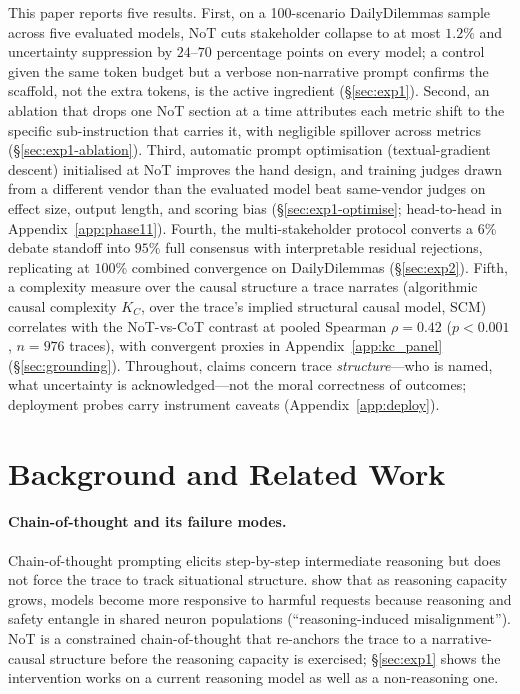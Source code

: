 \documentclass[11pt]{article}
\begin{document}
This paper reports five results. First, on a 100-scenario
DailyDilemmas sample across five evaluated models, NoT cuts
stakeholder collapse to at most $1.2\%$ and uncertainty suppression by
$24$--$70$ percentage points on every model; a control given the same
token budget but a verbose non-narrative prompt confirms the scaffold,
not the extra tokens, is the active ingredient (\S\ref{sec:exp1}).
Second, an ablation that drops one NoT section at a time attributes
each metric shift to the specific sub-instruction that carries it,
with negligible spillover across metrics
(\S\ref{sec:exp1-ablation}). Third, automatic prompt optimisation
(textual-gradient descent) initialised at NoT improves the hand
design, and training judges drawn from a different vendor than the
evaluated model beat same-vendor judges on effect size, output length,
and scoring bias (\S\ref{sec:exp1-optimise};
head-to-head in Appendix~\ref{app:phase11}). Fourth, the
multi-stakeholder protocol converts a $6\%$ debate standoff into
$95\%$ full consensus with interpretable residual rejections, replicating
at $100\%$ combined convergence on DailyDilemmas (\S\ref{sec:exp2}).
Fifth, a complexity measure over the causal structure a trace narrates
(algorithmic causal complexity $K_C$, over the trace's implied
structural causal model, SCM) correlates with the NoT-vs-CoT contrast
at pooled Spearman $\rho{=}0.42$ ($p{<}0.001$, $n{=}976$ traces), with
convergent proxies in Appendix~\ref{app:kc_panel}
(\S\ref{sec:grounding}). Throughout, claims concern
trace \emph{structure}---who is named, what uncertainty is
acknowledged---not the moral correctness of outcomes; deployment
probes carry instrument caveats (Appendix~\ref{app:deploy}).

\section{Background and Related Work}
\label{sec:related}

\paragraph{Chain-of-thought and its failure modes.} Chain-of-thought
prompting \citep{wei22, kojima22} elicits step-by-step intermediate
reasoning but does not force the trace to track situational structure.
\citet{yan2025rim} show that as reasoning capacity grows, models become
more responsive to harmful requests because reasoning and safety
entangle in shared neuron populations (``reasoning-induced
misalignment''). NoT is a constrained chain-of-thought that re-anchors
the trace to a narrative-causal structure before the reasoning capacity
is exercised; \S\ref{sec:exp1} shows the intervention works on a current
reasoning model as well as a non-reasoning one.
\end{document}
